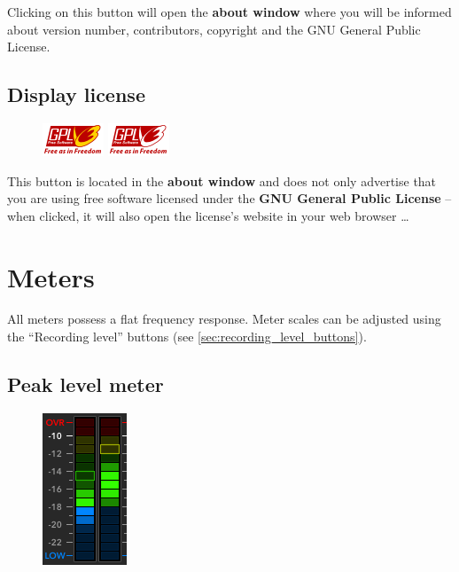 Clicking on this button will open the \textbf{about window} where you
will be informed about version number, contributors, copyright and the
GNU General Public License.

\section{Display license}

\begin{figure}
\includegraphics[scale=\screenshotscale,clip]{include/images/button_gpl_on.png}
\newline \vspace{-0.9\baselineskip}
\includegraphics[scale=\screenshotscale,clip]{include/images/button_gpl_off.png}
\end{figure}

This button is located in the \textbf{about window} and does not only
advertise that you are using free software licensed under the
\textbf{GNU General Public License} -- when clicked, it will also open
the license's website in your web browser \dots

\chapter{Meters}
\label{chap:meters}

All meters possess a flat frequency response.  Meter scales can be
adjusted using the ``Recording level'' buttons (see
\ref{sec:recording_level_buttons}).

\section{Peak level meter}

\begin{figure}
\includegraphics[scale=\screenshotscale,clip]{include/images/level_meter_peak.png}
\end{figure}

